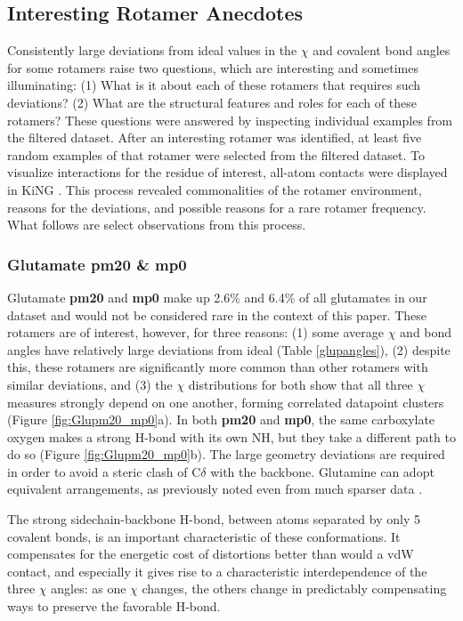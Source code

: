\subsection{Interesting Rotamer Anecdotes}
Consistently large deviations from ideal values in the $\chi$ and covalent bond angles for some rotamers raise two questions, which are interesting and sometimes illuminating: (1) What is it about each of these rotamers that requires such deviations? (2) What are the structural features and roles for each of these rotamers? These questions were answered by inspecting individual examples from the filtered dataset. After an interesting rotamer was identified, at least five random examples of that rotamer were selected from the filtered dataset. To visualize interactions for the residue of interest, all-atom contacts were displayed in KiNG \cite{Chen2009}. This process revealed commonalities of the rotamer environment, reasons for the deviations, and possible reasons for a rare rotamer frequency. What follows are select observations from this process.

\subsubsection{Glutamate \textbf{pm20} \& \textbf{mp0}}
Glutamate \textbf{pm20} and \textbf{mp0} make up 2.6\% and 6.4\% of all glutamates in our dataset and would not be considered rare in the context of this paper. These rotamers are of interest, however, for three reasons: (1) some average $\chi$ and bond angles have relatively large deviations from ideal (Table \ref{glupangles}), (2) despite this, these rotamers are significantly more common than other rotamers with similar deviations, and (3) the $\chi$ distributions for both show that all three $\chi$ measures strongly depend on one another, forming correlated datapoint clusters (Figure \ref{fig:Glupm20_mp0}a). In both \textbf{pm20} and \textbf{mp0}, the same carboxylate oxygen makes a strong H-bond with its own NH, but they take a different path to do so (Figure \ref{fig:Glupm20_mp0}b). The large geometry deviations are required in order to avoid a steric clash of C$\delta$ with the backbone.  Glutamine can adopt equivalent arrangements, as previously noted even from much sparser data \cite{Lovell1999}.

The strong sidechain-backbone H-bond, between atoms separated by only 5 covalent bonds, is an important characteristic of these conformations.  It compensates for the energetic cost of distortions better than would a vdW contact, and especially it gives rise to a characteristic interdependence of the three $\chi$ angles: as one $\chi$ changes, the others change in predictably compensating ways to preserve the favorable H-bond.


